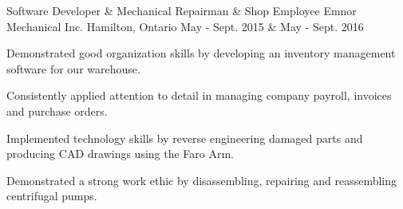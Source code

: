 \begin{cventries}
  \cventry
    {Software Developer \& Mechanical Repairman \& Shop Employee} %
    {Emnor Mechanical Inc.} %
    {Hamilton, Ontario} %
    {May - Sept. 2015 \& May - Sept. 2016} %
    {
      \begin{cvitems} %
        \item {Demonstrated good organization skills by developing an inventory management software for our warehouse.}
        \item {Consistently applied attention to detail in managing company payroll, invoices and purchase orders.}
        \item {Implemented technology skills by reverse engineering damaged parts and producing CAD drawings using the Faro Arm.}
        \item {Demonstrated a strong work ethic by disassembling, repairing and reassembling centrifugal pumps.}
      \end{cvitems}
    }


\end{cventries}

